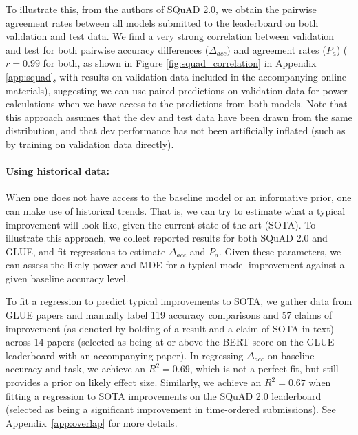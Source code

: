 \documentclass[11pt,a4paper]{article}
\begin{document}
To illustrate this, from the authors of SQuAD 2.0, we obtain the pairwise agreement rates between all models submitted to the leaderboard on both validation and test data.
We find
a very strong correlation between validation and test for both pairwise accuracy differences ($\Delta_{acc})$ and agreement rates ($P_a$)
($r=0.99$ for both, as shown in Figure \ref{fig:squad_correlation} in Appendix \ref{app:squad}, with results on validation data included in the accompanying online materials), suggesting we can use paired predictions on validation data for power calculations when we have access to the predictions from both models.
Note that this approach assumes that the dev and test data have been drawn from the same distribution, and that dev performance has not been artificially inflated (such as by training on validation data directly).

\paragraph{Using historical data:}
When one does not have access to the baseline model
or an informative prior,
one can make use of historical trends. That is, we can try to estimate what a typical improvement will look like, given the current state of the art (SOTA).
To illustrate this approach, we collect reported results for both SQuAD 2.0 and GLUE, and fit regressions to estimate $\Delta_{acc}$ and $P_a$. Given these parameters, we can assess the likely power and MDE for a typical model improvement against a given baseline accuracy level.

To fit a
regression 
to predict
typical improvements to SOTA,
we gather data from GLUE papers and manually label 119 accuracy comparisons and 57 claims of improvement (as denoted
by bolding of a
result
and a claim of SOTA
in text) across 14 papers (selected as being at or above the BERT score on the GLUE leaderboard with an accompanying paper). 
In regressing $\Delta_{acc}$ on baseline accuracy and task,
we achieve an $R^2 = 0.69$, which is not a perfect fit, but still provides a prior on likely effect size. Similarly, we achieve an $R^2=0.67$ when fitting a regression to SOTA improvements on the SQuAD 2.0 leaderboard (selected as being a significant improvement in time-ordered submissions). See Appendix~\ref{app:overlap} for more details.
\end{document}
